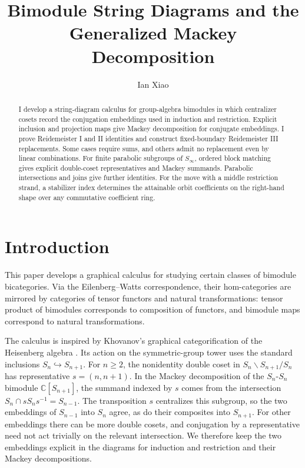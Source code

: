 \documentclass[11pt,a4paper]{article}
\title{\textbf{Bimodule String Diagrams and the\\Generalized Mackey Decomposition}}
\author{Ian Xiao}
\date{}
\numberwithin{equation}{section}
\theoremstyle{definition}
\newcommand{\C}{\mathbb C}
\begin{document}
\maketitle
\begin{abstract}
\noindent
I develop a string-diagram calculus for group-algebra bimodules in which
centralizer cosets record the conjugation embeddings used in induction
and restriction. Explicit inclusion and projection maps give Mackey
decomposition for conjugate embeddings. I prove Reidemeister I and II
identities and construct fixed-boundary Reidemeister III replacements.
Some cases require sums, and others admit no replacement even by linear
combinations. For finite parabolic subgroups of \(S_\infty\), ordered
block matching gives explicit double-coset representatives and Mackey
summands. Parabolic intersections and joins give further identities. For
the move with a middle restriction strand, a stabilizer index determines
the attainable orbit coefficients on the right-hand shape over any
commutative coefficient ring.
\end{abstract}

\makeatletter
\begingroup
\fontsize{10pt}{10.5pt}\selectfont
\setlength{\parskip}{0pt}
\renewcommand*{\l@section}[2]{%
  \addvspace{.2em}%
  \@dottedtocline{1}{0em}{1.7em}{\bfseries #1}{\bfseries #2}}
\renewcommand*{\l@subsection}{\@dottedtocline{2}{1.7em}{2.6em}}
\renewcommand*{\l@subsubsection}{\@dottedtocline{3}{4.3em}{3.2em}}
\tableofcontents
\endgroup
\makeatother

\section{Introduction}\label{sec:introduction}

This paper develops a graphical calculus for studying certain classes
of bimodule bicategories. Via the Eilenberg--Watts correspondence, their
hom-categories are mirrored by categories of tensor functors and natural
transformations: tensor product of bimodules corresponds to composition
of functors, and bimodule maps correspond to natural transformations.

The calculus is inspired by Khovanov's graphical categorification of
the Heisenberg algebra \cite[\S~3.3, Prop.~7]{khovanov}. Its action on
the symmetric-group tower uses the standard inclusions
\(S_n\hookrightarrow S_{n+1}\). For \(n\geq 2\), the nonidentity double
coset in \(S_n\backslash S_{n+1}/S_n\) has representative
\(s=(n,n+1)\). In the Mackey decomposition of the
\(S_n\)-\(S_n\) bimodule \(\C[S_{n+1}]\), the summand indexed by \(s\)
comes from the intersection \(S_n\cap sS_ns^{-1}=S_{n-1}\).
The transposition \(s\) centralizes this subgroup, so the two embeddings
of \(S_{n-1}\) into \(S_n\) agree, as do their composites into
\(S_{n+1}\). For other embeddings there can be more double cosets, and
conjugation by a representative need not act trivially on the relevant
intersection. We therefore keep the two embeddings explicit in the
diagrams for induction and restriction and their Mackey decompositions.
\end{document}
